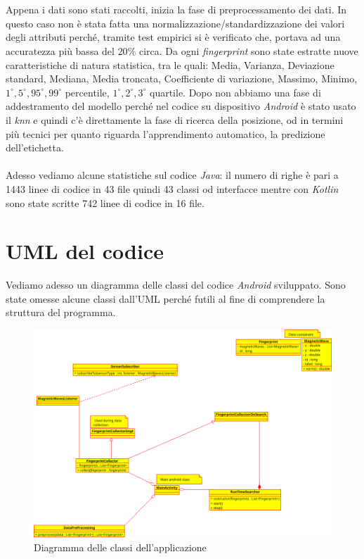\\\\
Appena i dati sono stati raccolti, inizia la fase di preprocessamento dei dati. In questo caso non \`e stata fatta una normalizzazione/standardizzazione dei valori degli attributi perch\'e, tramite test empirici si \`e verificato che, portava ad una accuratezza pi\`u  bassa del $20\%$ circa. Da ogni \textit{fingerprint} sono state estratte nuove caratteristiche di natura statistica, tra le quali: Media, Varianza, Deviazione standard, Mediana, Media troncata, Coefficiente di variazione, Massimo, Minimo, $ 1^{\circ}, 5^{\circ}, 95^{\circ}, 99^{\circ} $ percentile, $ 1^{\circ}, 2^{\circ}, 3^{\circ} $ quartile.
Dopo non abbiamo una fase di addestramento del modello perch\'e nel codice su dispositivo \textit{Android} \`e stato usato il \textit{knn} e quindi c'\`e direttamente la fase di ricerca della posizione, od in termini pi\`u  tecnici per quanto riguarda l'apprendimento automatico, la predizione dell'etichetta.
\\\\
Adesso vediamo alcune statistiche sul codice \textit{Java}: il numero di righe \`e pari a 1443 linee di codice in 43 file quindi 43 classi od interfacce mentre con \textit{Kotlin} sono state scritte 742 linee di codice in 16 file.


\section{UML del codice}
Vediamo adesso un diagramma delle classi del codice \textit{Android} sviluppato. Sono state omesse alcune classi dall'UML perch\'e futili al fine di comprendere la struttura del programma.

\begin{figure}[H]
	\centering
	\includegraphics[width=1\linewidth]{img/class_diagram}
	\caption{Diagramma delle classi dell'applicazione}
	\label{fig:classdiagram}
\end{figure}

